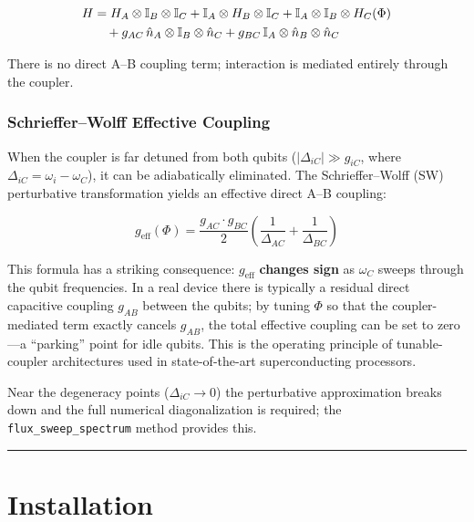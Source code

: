 \documentclass[11pt]{article}
\begin{document}
\begin{align}
  H &= H_A \otimes \mathbb{I}_B \otimes \mathbb{I}_C
     + \mathbb{I}_A \otimes H_B \otimes \mathbb{I}_C
     + \mathbb{I}_A \otimes \mathbb{I}_B \otimes H_C(\Phi) \notag \\
    &\quad + g_{AC}\,\hat{n}_A \otimes \mathbb{I}_B \otimes \hat{n}_C
     + g_{BC}\,\mathbb{I}_A \otimes \hat{n}_B \otimes \hat{n}_C
\end{align}

There is no direct A--B coupling term; interaction is mediated entirely through the coupler.

\subsubsection{Schrieffer--Wolff Effective Coupling}

When the coupler is far detuned from both qubits
($|\Delta_{iC}| \gg g_{iC}$, where $\Delta_{iC} = \omega_i - \omega_C$), it can be
adiabatically eliminated. The Schrieffer--Wolff (SW) perturbative transformation yields an
effective direct A--B coupling:

\begin{equation}
  g_\text{eff}(\Phi) = \frac{g_{AC}\cdot g_{BC}}{2}
                       \left(\frac{1}{\Delta_{AC}} + \frac{1}{\Delta_{BC}}\right)
\end{equation}

This formula has a striking consequence: $g_\text{eff}$ \textbf{changes sign} as $\omega_C$
sweeps through the qubit frequencies. In a real device there is typically a residual direct
capacitive coupling $g_{AB}$ between the qubits; by tuning $\Phi$ so that the coupler-mediated
term exactly cancels $g_{AB}$, the total effective coupling can be set to zero---a
``parking'' point for idle qubits. This is the operating principle of tunable-coupler
architectures used in state-of-the-art superconducting processors.

Near the degeneracy points ($\Delta_{iC} \to 0$) the perturbative approximation breaks down
and the full numerical diagonalization is required; the \texttt{flux\_sweep\_spectrum} method
provides this.

\hrule
\vspace{1em}

\section{Installation}
\end{document}
